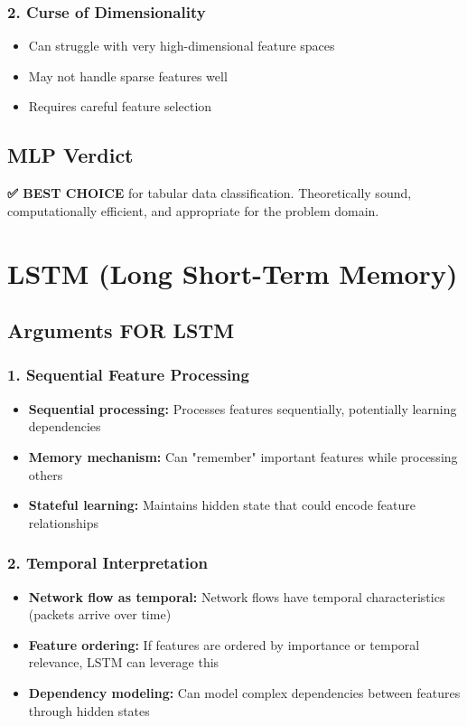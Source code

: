 \documentclass[12pt]{article}
\begin{document}
\subsubsection{2. Curse of Dimensionality}
\begin{itemize}
    \item Can struggle with very high-dimensional feature spaces
    \item May not handle sparse features well
    \item Requires careful feature selection
\end{itemize}

\subsection{MLP Verdict}

\textbf{✅ BEST CHOICE} for tabular data classification. Theoretically sound, computationally efficient, and appropriate for the problem domain.

\section{LSTM (Long Short-Term Memory)}

\subsection{Arguments FOR LSTM}

\subsubsection{1. Sequential Feature Processing}
\begin{itemize}
    \item \textbf{Sequential processing:} Processes features sequentially, potentially learning dependencies
    \item \textbf{Memory mechanism:} Can "remember" important features while processing others
    \item \textbf{Stateful learning:} Maintains hidden state that could encode feature relationships
\end{itemize}

\subsubsection{2. Temporal Interpretation}
\begin{itemize}
    \item \textbf{Network flow as temporal:} Network flows have temporal characteristics (packets arrive over time)
    \item \textbf{Feature ordering:} If features are ordered by importance or temporal relevance, LSTM can leverage this
    \item \textbf{Dependency modeling:} Can model complex dependencies between features through hidden states
\end{itemize}
\end{document}
